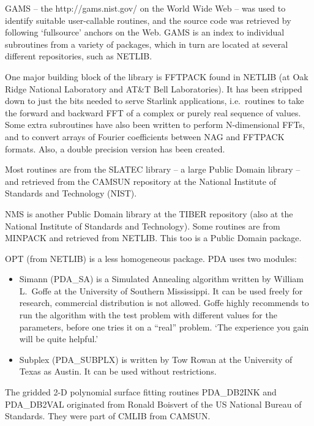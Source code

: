 \documentclass[11pt,twoside,nolof]{starlink}
\begin{document}
   GAMS -- the
{http://gams.nist.gov/}
   on the World Wide Web -- was used to identify suitable user-callable
   routines, and the source code was retrieved by following `fullsource'
   anchors on the Web. GAMS is an index to individual subroutines from a
   variety of packages, which in turn are located at several different
   repositories, such as NETLIB.

   One major building block of the library is FFTPACK found in NETLIB (at
   Oak Ridge National Laboratory and AT\&T Bell Laboratories).
   It has been stripped down to just the bits needed to serve Starlink
   applications, i.e.\ routines to take the forward and backward FFT
   of a complex or purely real sequence of values. Some extra
   subroutines have also been written to perform N-dimensional FFTs, and
   to convert arrays of Fourier coefficients between NAG and FFTPACK
   formats. Also, a double precision version has been created.

   Most routines are from the SLATEC library -- a large Public Domain
   library -- and retrieved from the CAMSUN repository at the National
   Institute of Standards and Technology (NIST).

   NMS is another Public Domain library at the TIBER repository (also at
   the National Institute of Standards and Technology).
   Some routines are from MINPACK and retrieved from NETLIB. This too is
   a Public Domain package.

   OPT (from NETLIB) is a less homogeneous package. PDA uses two modules:

\begin{itemize}
\item Simann (PDA\_SA) is a Simulated Annealing algorithm written by
   William L.\ Goffe at the University of Southern Mississippi. It can
   be used freely for research, commercial distribution is not allowed.
   Goffe highly recommends to run the
   algorithm with the test problem with different values for the
   parameters, before one tries it on a ``real'' problem. `The experience
   you gain will be quite helpful.'
\item Subplex (PDA\_SUBPLX) is written by Tow Rowan at the University of
   Texas as Austin. It can be used without restrictions.
\end{itemize}

The gridded 2-D polynomial surface fitting
routines PDA\_DB2INK and PDA\_DB2VAL originated from Ronald
Boisvert of the US National Bureau of Standards. They were
part of CMLIB from CAMSUN.
\end{document}
